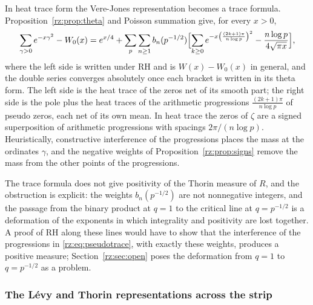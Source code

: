 In heat trace form the Vere-Jones representation becomes a trace formula. Proposition~\ref{rz:prop:theta} and Poisson summation give, for every $x>0$,
\begin{equation}\label{rz:eq:pseudotrace}
\sum_{\gamma>0}e^{-x\gamma^2}-W_0(x)=e^{x/4}+\sum_{p}\sum_{n\ge1}b_n(p^{-1/2})\Bigl[\sum_{k\ge0}e^{-x\left(\frac{(2k+1)\pi}{n\log p}\right)^2}-\frac{n\log p}{4\sqrt{\pi x}}\Bigr],
\end{equation}
where the left side is written under RH and is $W(x)-W_0(x)$ in general, and the double series converges absolutely once each bracket is written in its theta form. The left side is the heat trace of the zeros net of its smooth part; the right side is the pole plus the heat traces of the arithmetic progressions $\frac{(2k+1)\pi}{n\log p}$ of pseudo zeros, each net of its own mean. In heat trace the zeros of $\zeta$ are a signed superposition of arithmetic progressions with spacings $2\pi/(n\log p)$. Heuristically, constructive interference of the progressions places the mass at the ordinates $\gamma$, and the negative weights of Proposition~\ref{rz:prop:signs} remove the mass from the other points of the progressions.

The trace formula does not give positivity of the Thorin measure of $R$, and the obstruction is explicit: the weights $b_n(p^{-1/2})$ are not nonnegative integers, and the passage from the binary product at $q=1$ to the critical line at $q=p^{-1/2}$ is a deformation of the exponents in which integrality and positivity are lost together. A proof of RH along these lines would have to show that the interference of the progressions in \eqref{rz:eq:pseudotrace}, with exactly these weights, produces a positive measure; Section~\ref{rz:sec:open} poses the deformation from $q=1$ to $q=p^{-1/2}$ as a problem.

\subsubsection{The L\'evy and Thorin representations across the strip}\label{rz:sec:levystrip}

